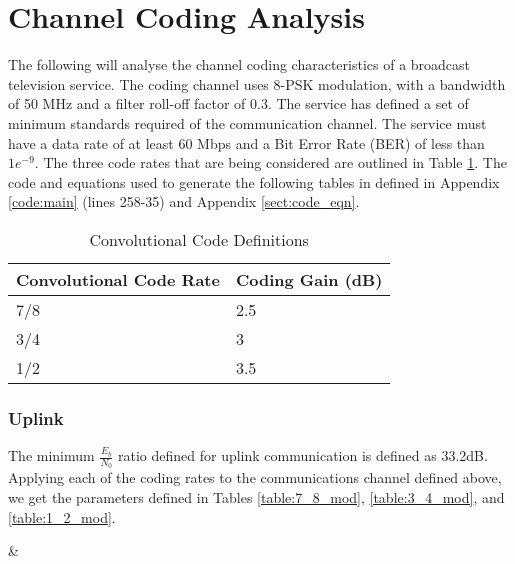 \documentclass[12pt]{article}
\begin{document}
\section{Channel Coding Analysis}
The following will analyse the channel coding characteristics of a broadcast television service. The coding channel uses 8-PSK modulation, with a bandwidth of 50 MHz and a filter roll-off factor of 0.3. The service has defined a set of minimum standards required of the communication channel. The service must have a data rate of at least 60 Mbps and a Bit Error Rate (BER) of less than \(1e^{-9}\). The three code rates that are being considered are outlined in Table \ref{table:codes}. The code and equations used to generate the following tables in defined in Appendix \ref{code:main} (lines 258-35) and Appendix \ref{sect:code_eqn}. 

\begin{table}[H]
\centering
\caption{Convolutional Code Definitions}
\label{table:codes}
\begin{tabular}{ll}
 \hline
Convolutional Code Rate         & Coding Gain (dB) \\
\hline
7/8                             & 2.5       \\
3/4                             & 3         \\
1/2                             & 3.5       \\
 \hline
\end{tabular}
\end{table}

\subsubsection{Uplink}
The minimum \(\frac{E_b}{N_0}\) ratio defined for uplink communication is defined as 33.2dB. Applying each of the coding rates to the communications channel defined above, we get the parameters defined in Tables \ref{table:7_8_mod}, \ref{table:3_4_mod}, and \ref{table:1_2_mod}.

{\Name & \Value }
\end{document}

